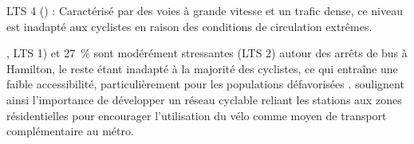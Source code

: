 \begin{refsegment}
{\begin{customitemize}
\item LTS 4 () : Caractérisé par des voies à grande vitesse et un trafic dense, ce niveau est inadapté aux cyclistes en raison des conditions de circulation extrêmes.
    \end{customitemize}
}, LTS 1) et 27~\% sont modérément stressantes (LTS 2) autour des arrêts de bus à Hamilton, le reste étant inadapté à la majorité des cyclistes, ce qui entraîne une faible accessibilité, particulièrement pour les populations défavorisées \textcolor{blue}{\autocite[13]{zuo_promote_2020}}. \textcolor{blue}{\textcite[50-51]{meng_influence_2016}} soulignent ainsi l'importance de développer un réseau cyclable reliant les stations aux zones résidentielles pour encourager l'utilisation du vélo comme moyen de transport complémentaire au métro.%


\end{refsegment}
